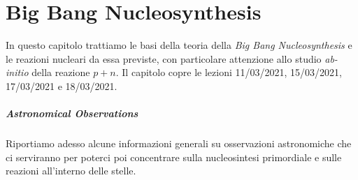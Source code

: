 \newcommand{\sol}{_{\odot}}
\newcommand{\Msol}{$M\sol { }$}


\chapter{Big Bang Nucleosynthesis}\label{cap-BBN}
In questo capitolo trattiamo le basi della teoria della \textit{Big Bang Nucleosynthesis} e le reazioni nucleari da essa previste, con particolare attenzione allo studio \textit{ab-initio} della reazione $p+n$. Il capitolo copre le lezioni 11/03/2021, 15/03/2021, 17/03/2021 e 18/03/2021.

\paragraph{Astronomical Observations}
Riportiamo adesso alcune informazioni generali su osservazioni astronomiche che ci serviranno per poterci poi concentrare sulla nucleosintesi primordiale e sulle reazioni all'interno delle stelle.

